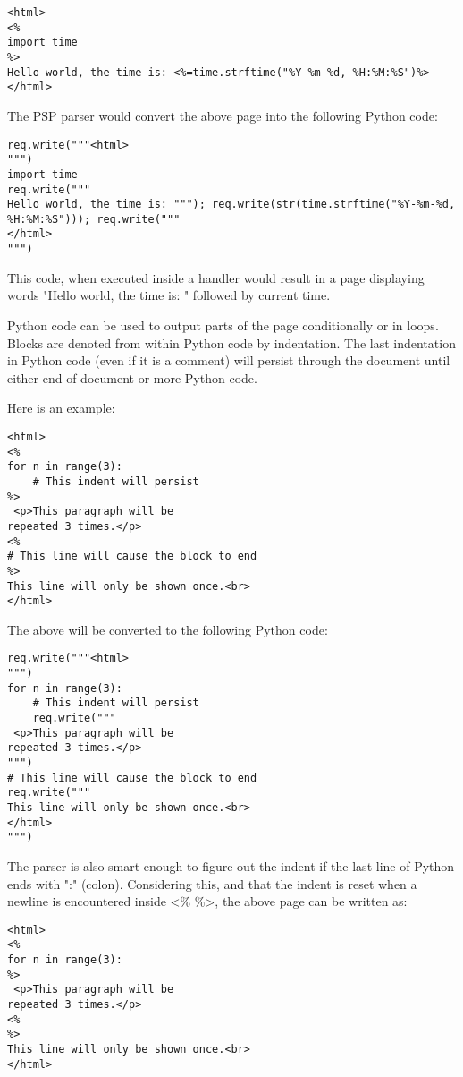 \begin{verbatim}
<html>
<%
import time
%>
Hello world, the time is: <%=time.strftime("%Y-%m-%d, %H:%M:%S")%>
</html>
\end{verbatim}

The PSP parser would convert the above page into the following Python code:

\begin{verbatim}
req.write("""<html>
""")
import time
req.write("""
Hello world, the time is: """); req.write(str(time.strftime("%Y-%m-%d, %H:%M:%S"))); req.write("""
</html>
""")
\end{verbatim}

This code, when executed inside a handler would result in a page
displaying words "Hello world, the time is: " followed by current time.

Python code can be used to output parts of the page conditionally or
in loops. Blocks are denoted from within Python code by
indentation. The last indentation in Python code (even if it is a
comment) will persist through the document until either end of
document or more Python code.

Here is an example:
\begin{verbatim}
<html>
<%
for n in range(3):
    # This indent will persist
%>
 <p>This paragraph will be 
repeated 3 times.</p>
<%
# This line will cause the block to end
%>
This line will only be shown once.<br>
</html>
\end{verbatim}

The above will be converted to the following Python code:

\begin{verbatim}
req.write("""<html>
""")
for n in range(3):
    # This indent will persist
    req.write("""
 <p>This paragraph will be
repeated 3 times.</p>
""")
# This line will cause the block to end
req.write("""
This line will only be shown once.<br>
</html>
""")
\end{verbatim}

The parser is also smart enough to figure out the indent if the last
line of Python ends with ":" (colon). Considering this, and that the
indent is reset when a newline is encountered inside <\% \%>, the
above page can be written as:

\begin{verbatim}
<html>
<%
for n in range(3):
%>
 <p>This paragraph will be 
repeated 3 times.</p>
<%
%>
This line will only be shown once.<br>
</html>
\end{verbatim}

